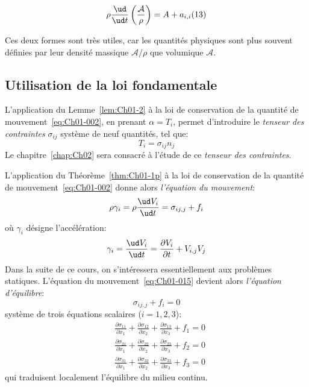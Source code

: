 \begin{thm}
    \begin{equation}
        \rho\frac{\ud}{\ud t}\left(\frac{\mathcal{A}}{\rho}\right)=A+a_{i,i}(13)
        \label{eq:Ch01-013}
    \end{equation}
    \label{thm:Ch01-1p}
\end{thm}
Ces deux formes sont très utiles, car les quantités physiques sont plus souvent définies par leur densité massique $\mathcal{A}/\rho$ que volumique $\mathcal{A}$.
\subsection{Utilisation de la loi fondamentale} \label{ssec:Ch01-1.3}
L'application du Lemme~\ref{lem:Ch01-2} à la loi de conservation de la quantité de mouvement~\eqref{eq:Ch01-002}, en prenant $\alpha=T_i$, permet d'introduire le \emph{tenseur des contraintes} $\sigma_{ij}$
système de neuf quantités, tel que:
\begin{equation}
    T_i=\sigma_{ij}n_j
    \label{eq:Ch01-014}
\end{equation}
Le chapitre~\ref{chap:Ch02} sera consacré à l'étude de ce \emph{tenseur des contraintes}.

L'application du Théorème~\ref{thm:Ch01-1p} à la loi de conservation de la quantité de mouvement~\eqref{eq:Ch01-002} donne alors \emph{l'équation du mouvement}:
\begin{equation}
    \rho\gamma_i=\rho\frac{\ud V_i}{\ud t}=\sigma_{ij,j}+f_i
    \label{eq:Ch01-015}
\end{equation}
où $\gamma_i$ désigne l'accélération:
\begin{equation}
    \gamma_i=\frac{\ud V_i}{\ud t}=\frac{\partial V_i}{\partial t}+V_{i,j}V_j
    \label{eq:Ch01-016}
\end{equation}
Dans la suite de ce cours, on s'intéressera essentiellement aux problèmes statiques.
L'équation du mouvement~\eqref{eq:Ch01-015} devient alors \emph{l'équation d'équilibre}:
\begin{equation}
    \sigma_{ij,j}+f_i=0
    \label{eq:Ch01-017}
\end{equation}
système de trois équations scalaires ($i=1,2,3$):
\begin{equation}
    \begin{aligned}
        &\frac{\partial \sigma_{11}}{\partial x_1}+\frac{\partial \sigma_{12}}{\partial x_2}+\frac{\partial \sigma_{13}}{\partial x_3}+f_1=0\\
        &\frac{\partial \sigma_{21}}{\partial x_1}+\frac{\partial \sigma_{22}}{\partial x_2}+\frac{\partial \sigma_{23}}{\partial x_3}+f_2=0\\
        &\frac{\partial \sigma_{31}}{\partial x_1}+\frac{\partial \sigma_{32}}{\partial x_2}+\frac{\partial \sigma_{33}}{\partial x_3}+f_3=0
    \end{aligned}
    \label{eq:Ch01-018}
\end{equation}
qui traduisent localement l'équilibre du milieu continu.

